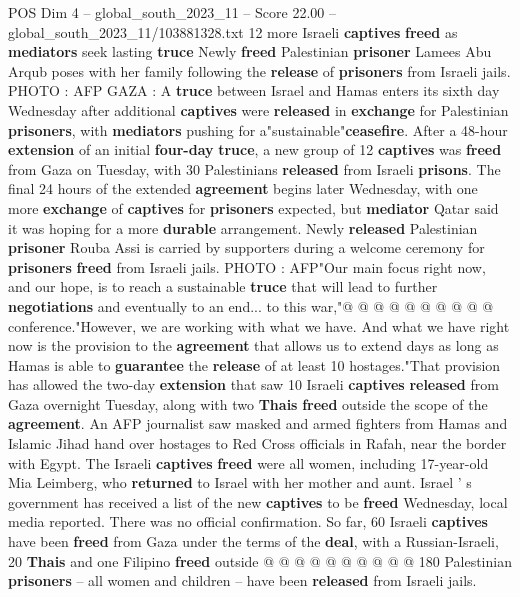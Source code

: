 \begin{textsample}{POS Dim 4 – global\_south\_2023\_11 – Score 22.00 – global\_south\_2023\_11/103881328.txt}  \label{ex:f4_pos_152}
12 more Israeli \textbf{captives} \textbf{freed} as \textbf{mediators} seek lasting \textbf{truce} Newly \textbf{freed} Palestinian \textbf{prisoner} Lamees Abu Arqub poses with her family following the \textbf{release} of \textbf{prisoners} from Israeli jails.
PHOTO : AFP GAZA : A \textbf{truce} between Israel and Hamas enters its sixth day Wednesday after additional \textbf{captives} were \textbf{released} in \textbf{exchange} for Palestinian \textbf{prisoners}, with \textbf{mediators} pushing for a"sustainable"\textbf{ceasefire}.
After a 48-hour \textbf{extension} of an initial \textbf{four-day} \textbf{truce}, a new group of 12 \textbf{captives} was \textbf{freed} from Gaza on Tuesday, with 30 Palestinians \textbf{released} from Israeli \textbf{prisons}.
The final 24 hours of the extended \textbf{agreement} begins later Wednesday, with one more \textbf{exchange} of \textbf{captives} for \textbf{prisoners} expected, but \textbf{mediator} Qatar said it was hoping for a more \textbf{durable} arrangement.
Newly \textbf{released} Palestinian \textbf{prisoner} Rouba Assi is carried by supporters during a welcome ceremony for \textbf{prisoners} \textbf{freed} from Israeli jails.
PHOTO : AFP"Our main focus right now, and our hope, is to reach a sustainable \textbf{truce} that will lead to further \textbf{negotiations} and eventually to an end... to this war,"@ @ @ @ @ @ @ @ @ @ conference."However, we are working with what we have.
And what we have right now is the provision to the \textbf{agreement} that allows us to extend days as long as Hamas is able to \textbf{guarantee} the \textbf{release} of at least 10 hostages."That provision has allowed the two-day \textbf{extension} that saw 10 Israeli \textbf{captives} \textbf{released} from Gaza overnight Tuesday, along with two \textbf{Thais} \textbf{freed} outside the scope of the \textbf{agreement}.
An AFP journalist saw masked and armed fighters from Hamas and Islamic Jihad hand over hostages to Red Cross officials in Rafah, near the border with Egypt.
The Israeli \textbf{captives} \textbf{freed} were all women, including 17-year-old Mia Leimberg, who \textbf{returned} to Israel with her mother and aunt.
Israel ' s government has received a list of the new \textbf{captives} to be \textbf{freed} Wednesday, local media reported.
There was no official confirmation.
So far, 60 Israeli \textbf{captives} have been \textbf{freed} from Gaza under the terms of the \textbf{deal}, with a Russian-Israeli, 20 \textbf{Thais} and one Filipino \textbf{freed} outside @ @ @ @ @ @ @ @ @ @ 180 Palestinian \textbf{prisoners} -- all women and children -- have been \textbf{released} from Israeli jails.

\end{textsample}
